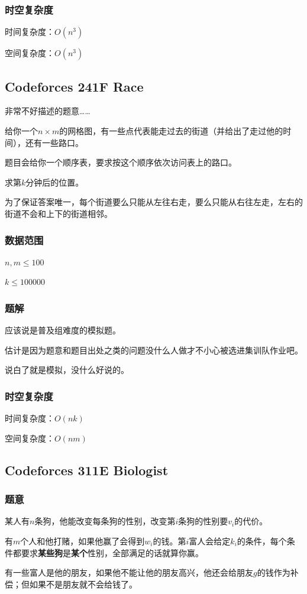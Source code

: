 \documentclass{ctexart}
\begin{document}
\subsubsection{时空复杂度}
时间复杂度：$O(n^3)$

空间复杂度：$O(n^3)$
\subsection{Codeforces 241F Race}
非常不好描述的题意……

给你一个$n \times m$的网格图，有一些点代表能走过去的街道（并给出了走过他的时间），还有一些路口。

题目会给你一个顺序表，要求按这个顺序依次访问表上的路口。

求第$k$分钟后的位置。

为了保证答案唯一，每个街道要么只能从左往右走，要么只能从右往左走，左右的街道不会和上下的街道相邻。
\subsubsection{数据范围}
$n,m \le 100$

$k \le 100000$
\subsubsection{题解}
应该说是普及组难度的模拟题。

估计是因为题意和题目出处之类的问题没什么人做才不小心被选进集训队作业吧。

说白了就是模拟，没什么好说的。
\subsubsection{时空复杂度}
时间复杂度：$O(nk)$

空间复杂度：$O(nm)$
\subsection{Codeforces 311E Biologist}
\subsubsection{题意}
某人有$n$条狗，他能改变每条狗的性别，改变第$i$条狗的性别要$v_i$的代价。

有$m$个人和他打赌，如果他赢了会得到$w_i$的钱。第$i$富人会给定$k_i$的条件，每个条件都要求\textbf{某些狗}是\textbf{某个}性别，全部满足的话就算你赢。

有一些富人是他的朋友，如果他不能让他的朋友高兴，他还会给朋友$g$的钱作为补偿；但如果不是朋友就不会给钱了。
\end{document}
